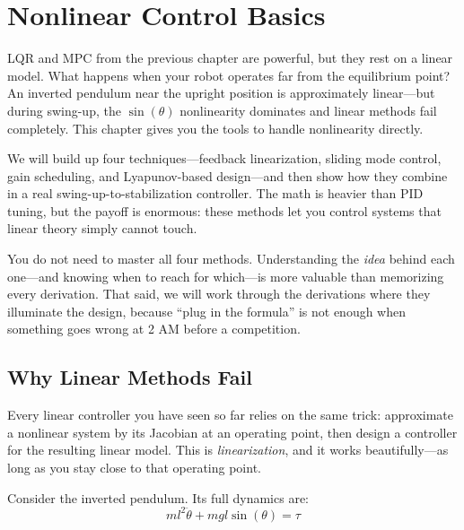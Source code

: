 \section{Nonlinear Control Basics}

LQR and MPC from the previous chapter are powerful, but they rest on a linear model. What happens when your robot operates far from the equilibrium point? An inverted pendulum near the upright position is approximately linear---but during swing-up, the $\sin(\theta)$ nonlinearity dominates and linear methods fail completely. This chapter gives you the tools to handle nonlinearity directly.

We will build up four techniques---feedback linearization, sliding mode control, gain scheduling, and Lyapunov-based design---and then show how they combine in a real swing-up-to-stabilization controller. The math is heavier than PID tuning, but the payoff is enormous: these methods let you control systems that linear theory simply cannot touch.

You do not need to master all four methods. Understanding the \textit{idea} behind each one---and knowing when to reach for which---is more valuable than memorizing every derivation. That said, we will work through the derivations where they illuminate the design, because ``plug in the formula'' is not enough when something goes wrong at 2 AM before a competition.

\subsection{Why Linear Methods Fail}

Every linear controller you have seen so far relies on the same trick: approximate a nonlinear system by its Jacobian at an operating point, then design a controller for the resulting linear model. This is \textit{linearization}, and it works beautifully---as long as you stay close to that operating point.

Consider the inverted pendulum. Its full dynamics are:
\begin{equation}
ml^2 \ddot{\theta} + mgl\sin(\theta) = \tau
\end{equation}

